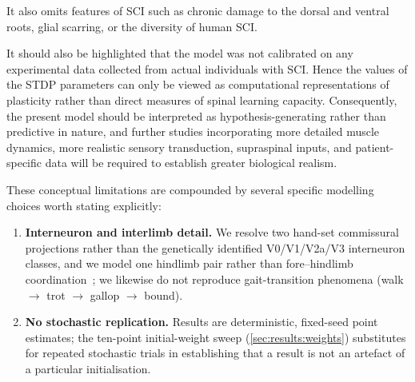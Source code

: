 It also omits features of SCI such as chronic damage to the dorsal and
ventral roots, glial scarring, or the diversity of human SCI.

It should also be highlighted that the model was not calibrated on any
experimental data collected from actual individuals with SCI. Hence the
values of the STDP parameters can only be viewed as computational
representations of plasticity rather than direct measures of spinal
learning capacity. Consequently, the present model should be interpreted
as hypothesis-generating rather than predictive in nature, and further
studies incorporating more detailed muscle dynamics, more realistic
sensory transduction, supraspinal inputs, and patient-specific data will
be required to establish greater biological realism.

These conceptual limitations are compounded by several specific modelling
choices worth stating explicitly:

\begin{enumerate}
  \item \textbf{Interneuron and interlimb detail.} We resolve two hand-set
        commissural projections rather than the genetically identified
        V0/V1/V2a/V3 interneuron classes, and we model one hindlimb pair
        rather than fore--hindlimb coordination~\cite{zhang2022}; we
        likewise do not reproduce gait-transition phenomena
        (walk $\to$ trot $\to$ gallop $\to$ bound).
  \item \textbf{No stochastic replication.} Results are deterministic,
        fixed-seed point estimates; the ten-point initial-weight sweep
        (\autoref{sec:results:weights}) substitutes for repeated stochastic
        trials in establishing that a result is not an artefact of a
        particular initialisation.
\end{enumerate}

